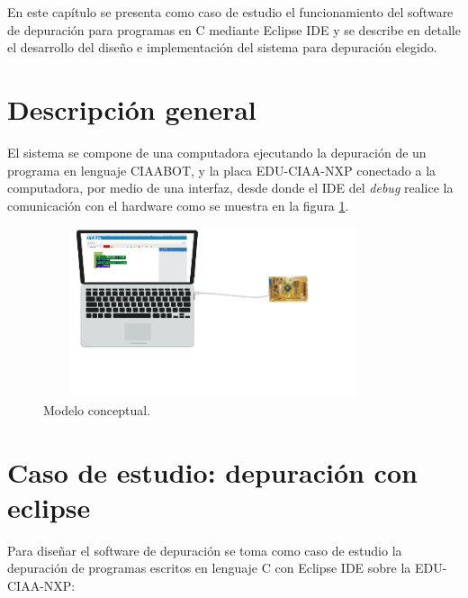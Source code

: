 En este capítulo se presenta como caso de estudio el funcionamiento del software de depuración para programas en C mediante Eclipse IDE y se describe en detalle el desarrollo del diseño e implementación del sistema para depuración elegido. 


\section{Descripción general}
\label{sec:Descripción general}

El sistema se compone de una computadora ejecutando la depuración de un programa en lenguaje CIAABOT, y la placa EDU-CIAA-NXP conectado a la computadora, por medio de una interfaz, desde donde el IDE del \emph{debug} realice la comunicación con el hardware como se muestra en la figura \ref{fig:pc-bloques}.

\begin{figure}[!htbp]
    \begin{center}  %
	\includegraphics*[width=10cm,height=5cm]{./Figures/pc-bloques.png}
	\par\caption{Modelo conceptual.}\label{fig:pc-bloques}
	\end{center}
\end{figure}


\section{Caso de estudio: depuración con eclipse}
\label{sec:Alternativa de diseño}

Para diseñar el software de depuración se toma como caso de estudio la depuración de programas escritos en lenguaje C con Eclipse IDE sobre la EDU-CIAA-NXP:


